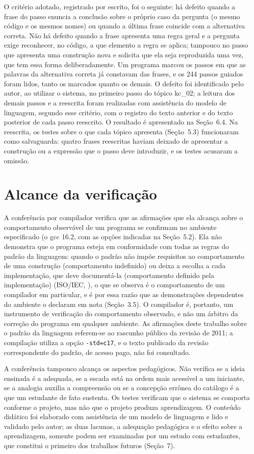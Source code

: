 O critério adotado, registrado por escrito, foi o seguinte: há defeito quando a frase do passo enuncia a conclusão sobre o próprio caso da pergunta (o mesmo código e os mesmos nomes) ou quando a última frase coincide com a alternativa correta. Não há defeito quando a frase apresenta uma regra geral e a pergunta exige reconhecer, no código, a que elemento a regra se aplica; tampouco no passo que apresenta uma construção nova e solicita que ela seja reproduzida uma vez, que tem essa forma deliberadamente. Um programa marcou os passos em que as palavras da alternativa correta já constavam das frases, e os 244 passos guiados foram lidos, tanto os marcados quanto os demais. O defeito foi identificado pelo autor, ao utilizar o sistema, no primeiro passo do tópico kc\_02; a leitura dos demais passos e a reescrita foram realizadas com assistência do modelo de linguagem, segundo esse critério, com o registro do texto anterior e do texto posterior de cada passo reescrito. O resultado é apresentado na Seção~6.4. Na reescrita, os testes sobre o que cada tópico apresenta (Seção~5.3) funcionaram como salvaguarda: quatro frases reescritas haviam deixado de apresentar a construção ou a expressão que o passo deve introduzir, e os testes acusaram a omissão.

\section{Alcance da verificação}

A conferência por compilador verifica que as afirmações que ela alcança sobre o comportamento observável de um programa se confirmam no ambiente especificado (o gcc 16.2, com as opções indicadas na Seção~5.2). Ela não demonstra que o programa esteja em conformidade com todas as regras do padrão da linguagem: quando o padrão não impõe requisitos ao comportamento de uma construção (comportamento indefinido) ou deixa a escolha a cada implementação, que deve documentá-la (comportamento definido pela implementação) (ISO/IEC, \citeyear{isoiec2011}), o que se observa é o comportamento de um compilador em particular, e é por essa razão que as demonstrações dependentes do ambiente o declaram em nota (Seção~3.5). O compilador é, portanto, um instrumento de verificação do comportamento observado, e não um árbitro da correção do programa em qualquer ambiente. As afirmações deste trabalho sobre o padrão da linguagem referem-se ao rascunho público da revisão de 2011; a compilação utiliza a opção \texttt{-{}std=c17}, e o texto publicado da revisão correspondente do padrão, de acesso pago, não foi consultado.

A conferência tampouco alcança os aspectos pedagógicos. Não verifica se a ideia ensinada é a adequada, se a escada está na ordem mais acessível a um iniciante, se a analogia auxilia a compreensão ou se a concepção errônea do catálogo é a que um estudante de fato sustenta. Os testes verificam que o sistema se comporta conforme o projeto, mas não que o projeto produza aprendizagem. O conteúdo didático foi elaborado com assistência de um modelo de linguagem e lido e validado pelo autor; as duas lacunas, a adequação pedagógica e o efeito sobre a aprendizagem, somente podem ser examinadas por um estudo com estudantes, que constitui o primeiro dos trabalhos futuros (Seção~7).
